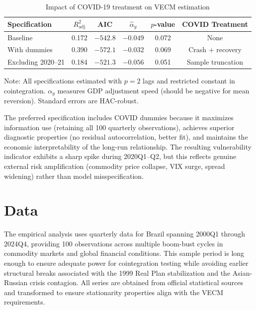 \documentclass[12pt,a4paper]{article}
\numberwithin{equation}{section}
\theoremstyle{definition}
\theoremstyle{remark}
\begin{document}
\begin{table}[ht]
\centering
\begin{threeparttable}
\caption{Impact of COVID-19 treatment on VECM estimation}
\label{tab:covid_treatment}
\begin{tabular}{@{}lccccc@{}}
\toprule
\textbf{Specification} & $R^2_{\text{adj}}$ & \textbf{AIC} & $\hat{\alpha}_y$ & $p$-value & \textbf{COVID Treatment} \\
\midrule
Baseline & 0.172 & $-542.8$ & $-0.049$ & 0.072 & None \\
With dummies & 0.390 & $-572.1$ & $-0.032$ & 0.069 & Crash + recovery \\
Excluding 2020--21 & 0.184 & $-521.3$ & $-0.056$ & 0.051 & Sample truncation \\
\bottomrule
\end{tabular}
\begin{tablenotes}\footnotesize
\item Note: All specifications estimated with $p=2$ lags and restricted constant in cointegration. $\alpha_y$ measures GDP adjustment speed (should be negative for mean reversion). Standard errors are HAC-robust.
\end{tablenotes}
\end{threeparttable}
\end{table}

The preferred specification includes COVID dummies because it maximizes information use (retaining all 100 quarterly observations), achieves superior diagnostic properties (no residual autocorrelation, better fit), and maintains the economic interpretability of the long-run relationship. The resulting vulnerability indicator exhibits a sharp spike during 2020Q1--Q2, but this reflects genuine external risk amplification (commodity price collapse, VIX surge, spread widening) rather than model misspecification.


\section{Data}
\label{sec:data}

The empirical analysis uses quarterly data for Brazil spanning 2000Q1 through 2024Q4, providing 100 observations across multiple boom-bust cycles in commodity markets and global financial conditions. This sample period is long enough to ensure adequate power for cointegration testing while avoiding earlier structural breaks associated with the 1999 Real Plan stabilization and the Asian-Russian crisis contagion. All series are obtained from official statistical sources and transformed to ensure stationarity properties align with the VECM requirements.
\end{document}
